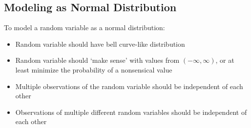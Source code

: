 \documentclass[../main]{subfiles}
\begin{document}
	\subsection{Modeling as Normal Distribution}

	To model a random variable as a normal distribution:

	\begin{itemize}
		\item Random variable should have bell curve-like distribution
		\item Random variable should `make sense' with values from \((-\infty,\infty)\), or at least minimize the probability of a nonsensical value
		\item Multiple observations of the random variable should be independent of each other
		\item Observations of multiple different random variables should be independent of each other
	\end{itemize}
\end{document}
